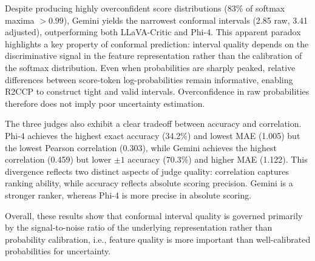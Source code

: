 \documentclass{article}
\begin{document}
Despite producing highly overconfident score distributions (83\% of softmax maxima $> 0.99$), Gemini yields the narrowest conformal intervals (2.85 raw, 3.41 adjusted), outperforming both LLaVA-Critic and Phi-4. This apparent paradox highlights a key property of conformal prediction: interval quality depends on the discriminative signal in the feature representation rather than the calibration of the softmax distribution. Even when probabilities are sharply peaked, relative differences between score-token log-probabilities remain informative, enabling R2CCP to construct tight and valid intervals. Overconfidence in raw probabilities therefore does not imply poor uncertainty estimation.

The three judges also exhibit a clear tradeoff between accuracy and correlation. Phi-4 achieves the highest exact accuracy (34.2\%) and lowest MAE (1.005) but the lowest Pearson correlation (0.303), while Gemini achieves the highest correlation (0.459) but lower $\pm 1$ accuracy (70.3\%) and higher MAE (1.122). This divergence reflects two distinct aspects of judge quality: correlation captures ranking ability, while accuracy reflects absolute scoring precision. Gemini is a stronger ranker, whereas Phi-4 is more precise in absolute scoring.

Overall, these results show that conformal interval quality is governed primarily by the signal-to-noise ratio of the underlying representation rather than probability calibration, i.e., feature quality is more important than well-calibrated probabilities for uncertainty.
\end{document}
